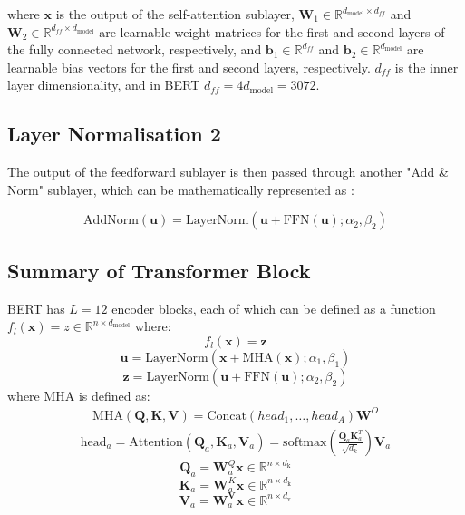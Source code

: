 where $\mathbf{x}$ is the output of the self-attention sublayer, $\mathbf{W}_1 \in \mathbb{R}^
{d_{\text{model}} \times d_{ff}}$ and $\mathbf{W}_2 \in \mathbb{R}^{d_{ff} \times d_{\text{model}}}$ are learnable weight matrices for the first and second layers of the fully connected network, respectively, and $\mathbf{b}_1 \in \mathbb{R}^{d_{ff}}$ and $\mathbf{b}_2 \in \mathbb{R}^{d_{\text{model}}}$ are learnable bias vectors for the first and second layers, respectively. $d_{ff}$ is the inner layer dimensionality, and in BERT $d_{ff} = 4d_\text{model} = 3072$.

\subsection{Layer Normalisation 2}

The output of the feedforward sublayer is then passed through another "Add \& Norm" sublayer, which can be mathematically represented as \cite{thickstun_transformer_2020}:

$$\text{AddNorm}(\mathbf{u}) = \text{LayerNorm}(\mathbf{u} + \text{FFN}(\mathbf{u}); \alpha_2, \beta_2)$$

\subsection{Summary of Transformer Block}

BERT has $L = 12$ encoder blocks, each of which can be defined as a function $f_l(\mathbf{x}) = z \in \mathbb{R}^{n \times d_{\text{model}}}$ where:
$$f_l(\mathbf{x}) = \mathbf{z}$$
\begin{equation}
    \mathbf{u}= \text{LayerNorm}(\mathbf{\mathbf{x}} + \text{MHA}(\mathbf{x}); \alpha_1, \beta_1)
\end{equation}
\begin{equation} 
    \mathbf{z} = \text{LayerNorm}(\mathbf{u} + \text{FFN}(\mathbf{\mathbf{u}}); \alpha_2, \beta_2)
\end{equation}
where MHA is defined as:
\begin{align*}
    \text{MHA}(\mathbf{Q}, \mathbf{K}, \mathbf{V}) = \text{Concat}(head_1, \dots, head_A)\mathbf{W}^O
\end{align*}
\begin{align*}
    \text{head}_a = \text{Attention}(\mathbf{Q}_a, \mathbf{K}_a, \mathbf{V}_a) = \text{softmax}(\frac{\mathbf{Q}_{a}\mathbf{K}_{a}^T}{\sqrt{d_k}})\mathbf{V}_a
\end{align*}
$$ \mathbf{Q}_a = \mathbf{W}_a^Q  \mathbf{x} \in \mathbb{R}^
{n \times d_{\text{k}}}$$
$$ \mathbf{K}_a = \mathbf{W}_a^K \mathbf{x} \in \mathbb{R}^
{n \times d_{\text{k}}}$$
$$ \mathbf{V}_a = \mathbf{W}_a^\mathbf{V}  \mathbf{x} \in \mathbb{R}^
{n \times d_{\text{v}}}$$

